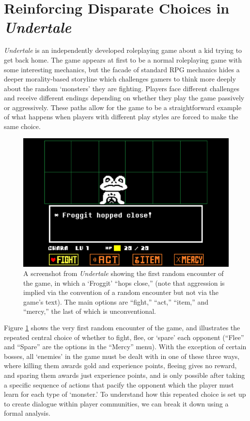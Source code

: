 \documentclass[arts,article,submit,moreauthors,pdftex,10pt,a4paper]{Definitions/mdpi}
\begin{document}
\section{Reinforcing Disparate Choices in \emph{Undertale}}


\emph{Undertale} is an independently developed roleplaying game \citep{fox2015undertale} about a kid trying to get back home.
%
The game appears at first to be a normal roleplaying game with some interesting mechanics, but the facade of standard RPG mechanics hides a deeper morality-based storyline which challenges gamers to think more deeply about the random `monsters' they are fighting.
%
Players face different challenges and receive different endings depending on whether they play the game passively or aggressively.
%
These paths allow for the game to be a straightforward example of what happens when players with different play styles are forced to make the same choice.

\begin{figure}[t]
    \includegraphics[width=\textwidth]{fig/froggit.png}
    \caption{A screenshot from \emph{Undertale} showing the first random encounter of the game, in which a `Froggit' ``hops close,'' (note that aggression is implied via the convention of a random encounter but not via the game's text). The main options are ``fight,'' ``act,'' ``item,'' and ``mercy,'' the last of which is unconventional.}
    \label{fig:UT_froggit}
\end{figure}

Figure \ref{fig:UT_froggit} shows the very first random encounter of the game, and illustrates the repeated central choice of whether to fight, flee, or `spare' each opponent (``Flee'' and ``Spare'' are the options in the ``Mercy'' menu).
%
With the exception of certain bosses, all `enemies' in the game must be dealt with in one of these three ways, where killing them awards gold and experience points, fleeing gives no reward, and sparing them awards just experience points, and is only possible after taking a specific sequence of actions that pacify the opponent which the player must learn for each type of `monster.'
%
To understand how this repeated choice is set up to create dialogue within player communities, we can break it down using a formal analysis.
\end{document}
